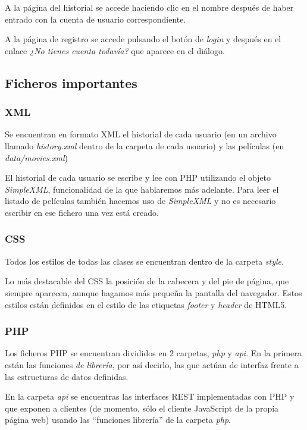 \documentclass{apuntes}
\begin{document}
A la página del historial se accede haciendo clic en el nombre después de haber entrado con la cuenta de usuario correspondiente. 

A la página de registro se accede pulsando el botón de \textit{login} y después en el enlace \textit{¿No tienes cuenta todavía?} que aparece en el diálogo. 


\subsection{Ficheros importantes}

\subsubsection{XML}

Se encuentran en formato XML el historial de cada usuario (en un archivo llamado \textit{history.xml} dentro de la carpeta de cada usuario) y las películas (en \textit{data/movies.xml})


El historial de cada usuario se escribe y lee con PHP utilizando el objeto \textit{SimpleXML}, funcionalidad de la que hablaremos más adelante. Para leer el listado de películas también hacemos uso de \textit{SimpleXML} y no es necesario escribir en ese fichero una vez está creado.



\subsubsection{CSS}

Todos los estilos de todas las clases se encuentran dentro de la carpeta \textit{style}. 

Lo más destacable del CSS la posición de la cabecera y del pie de página, que siempre aparecen, aunque hagamos más pequeña la pantalla del navegador. Estos estilos están definidos en el estilo de las etiquetas \textit{footer} y \textit{header} de HTML5.

\subsubsection{PHP}

Los ficheros PHP se encuentran divididos en 2 carpetas, \textit{php} y \textit{api}. En la primera están las funciones \textit{de librería}, por así decirlo, las que actúan de interfaz frente a las estructuras de datos definidas.

En la carpeta \textit{api} se encuentras las interfaces REST implementadas con PHP y que exponen a clientes (de momento, sólo el cliente JavaScript de la propia página web) usando las ``funciones librería'' de la carpeta \textit{php}.
\end{document}
